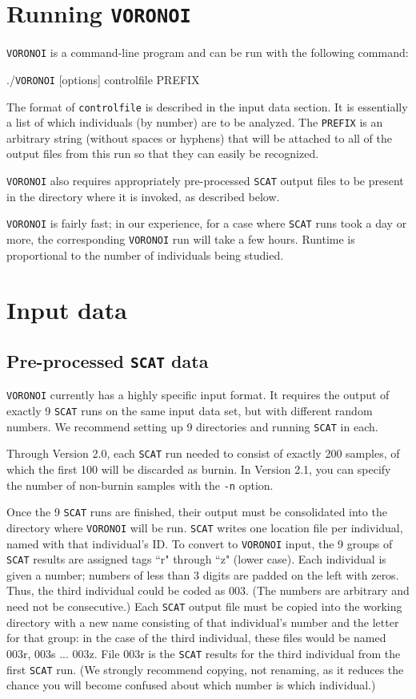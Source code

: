 \documentclass[10pt,titlepage,times,letterpaper]{article}
\def\SCAT{{\tt SCAT} }
\def\VORONOI{{\tt VORONOI} }
\begin{document}
\section{Running \VORONOI}

\VORONOI is a command-line program and can be run with the following command:

./\VORONOI [options] controlfile PREFIX

The format of {\tt controlfile} is described in the input data section.  It is essentially a list
of which individuals (by number) are to be analyzed.  The {\tt PREFIX} is an arbitrary string (without
spaces or hyphens) that will be attached to all of the output files from this run so that they can
easily be recognized.

\VORONOI also requires appropriately pre-processed \SCAT output files to be present in the
directory where it is invoked, as described below.

\VORONOI is fairly fast; in our experience, for a case where \SCAT runs took a day or 
more, the corresponding \VORONOI run will take a few hours.  Runtime is proportional to
the number of individuals being studied.

\section{Input data}

\subsection{Pre-processed \SCAT data}

\VORONOI currently has a highly specific input format.  It requires the output of exactly
9 \SCAT runs on the same input data set, but with different random numbers.  
We recommend setting up 9 directories and running \SCAT in each.

Through Version 2.0, each \SCAT run needed to consist of exactly 200 samples, of which
the first 100 will be discarded as burnin.  In Version 2.1, you can specify the number of
non-burnin samples with the {\tt -n} option.

Once the 9 \SCAT runs are finished, their output must be consolidated into the directory
where \VORONOI will be run.
\SCAT writes one location file per individual, named with that individual's ID. 
To convert to \VORONOI input, the 9 groups of \SCAT
results are assigned tags ``r" through ``z" (lower case).  Each individual is 
given a number; numbers of less than 3 digits are padded on the left with zeros.  Thus, the
third individual could be coded as 003.  (The numbers are arbitrary and need not 
be consecutive.)  Each \SCAT output file must be copied into the working
directory with a new name consisting of that individual's number
and the letter for that group:  in the case of the third individual, these files would
be named 003r, 003s ... 003z.  File 003r is the \SCAT results for the third individual from
the first \SCAT run.  (We strongly recommend copying, not renaming, as it reduces
the chance you will become confused about which number is which individual.)
\end{document}
